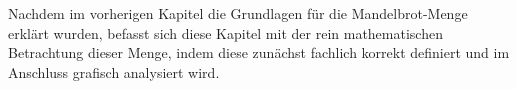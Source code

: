 
Nachdem im vorherigen Kapitel die Grundlagen für die Mandelbrot-Menge
erklärt wurden, befasst sich diese Kapitel mit der rein mathematischen Betrachtung
dieser Menge, indem diese zunächst fachlich korrekt definiert und
im Anschluss grafisch analysiert wird.



